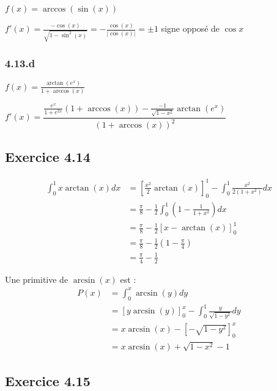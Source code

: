 \documentclass[a4paper,10pt]{report}
\begin{document}
$f(x) = \arccos(\sin(x)) $

$f'(x) = \frac{-\cos(x)}{\sqrt{1-\sin^2(x)}} = -\frac{\cos(x)}{|\cos(x)|} =\pm1$ signe opposé de $\cos x$

\subsubsection*{4.13.d}

$f(x) = \frac{\arctan(e^x)}{1 + \arccos(x)} $

$f'(x) = \dfrac{\frac{e^x}{1+e^{2x}}(1 + \arccos(x)) - \frac{-1}{\sqrt{1-x^2}} \arctan(e^x)}{(1 + \arccos(x))^2} $

\subsection*{Exercice 4.14}

\begin{equation*}
	\begin{split}
		\int_0^1 x \arctan(x) dx &= \left[ \frac{x^2}{2} \arctan(x) \right] _0^1 - \int_0^1 \frac{x^2}{2(1+x^2)} dx \\
		                         &= \frac{\pi}{8} - \frac{1}{2} \int_0^1 \left( 1 - \frac{1}{1+x^2}\right) dx \\
		                         &= \frac{\pi}{8} - \frac{1}{2}\left[ x -\arctan(x) \right]_0^1 \\
		                         &= \frac{\pi}{8} - \frac{1}{2} \left(1 - \frac{\pi}{4}  \right)  \\
		                         &= \frac{\pi}{4} - \frac{1}{2}
	\end{split}
\end{equation*}

Une primitive de $\arcsin(x)$ est :
\begin{equation*}
	\begin{split}
		P(x) &= \int_0^x \arcsin(y) dy \\
		     &= \left[ y \arcsin(y) \right]_0^x - \int_0^1 \frac{y}{\sqrt{1-y^2}} dy \\
		     &= x \arcsin(x) - [-\sqrt{1-y^2}]_0^x \\
		     &= x \arcsin(x) + \sqrt{1-x^2} -1
	\end{split}
\end{equation*}

\subsection*{Exercice 4.15}
\end{document}
